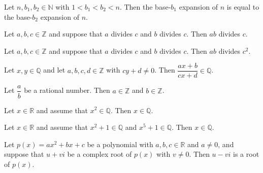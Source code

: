 \begin{chapex} %
Let $n,b_1,b_2 \in \mathbb{N}$ with $1 < b_1 < b_2 < n$. Then the base-$b_1$ expansion of $n$ is equal to the base-$b_2$ expansion of $n$.
\end{chapex}

\begin{chapex} %
Let $a,b,c \in \mathbb{Z}$ and suppose that $a$ divides $c$ and $b$ divides $c$. Then $ab$ divides $c$.
\end{chapex}

\begin{chapex} %
Let $a,b,c \in \mathbb{Z}$ and suppose that $a$ divides $c$ and $b$ divides $c$. Then $ab$ divides $c^2$.
\end{chapex}

\begin{chapex} %
Let $x,y \in \mathbb{Q}$ and let $a,b,c,d \in \mathbb{Z}$ with $cy+d \ne 0$. Then $\dfrac{ax+b}{cx+d} \in \mathbb{Q}$.
\end{chapex}

\begin{chapex} %
Let $\dfrac{a}{b}$ be a rational number. Then $a \in \mathbb{Z}$ and $b \in \mathbb{Z}$.
\end{chapex}

\begin{chapex} %
Let $x \in \mathbb{R}$ and assume that $x^2 \in \mathbb{Q}$. Then $x \in \mathbb{Q}$.
\end{chapex}

\begin{chapex} %
Let $x \in \mathbb{R}$ and assume that $x^2+1 \in \mathbb{Q}$ and $x^5+1 \in \mathbb{Q}$. Then $x \in \mathbb{Q}$.
\end{chapex}

\begin{chapex} %
\label{cqGettingStartedASNEnd}
Let $p(x) = ax^2+bx+c$ be a polynomial with $a,b,c \in \mathbb{R}$ and $a \ne 0$, and suppose that $u+vi$ be a complex root of $p(x)$ with $v \ne 0$. Then $u-vi$ is a root of $p(x)$.
\end{chapex}